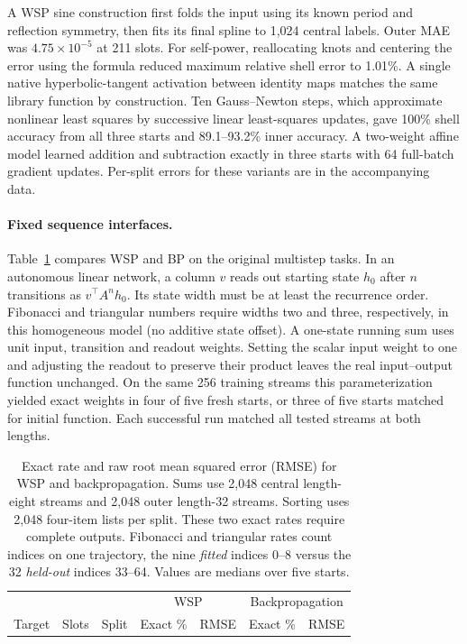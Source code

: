 A WSP sine construction first folds the input using its known period and reflection symmetry, then fits its final spline to 1,024 central labels. Outer MAE was $4.75\times10^{-5}$ at 211 slots. For self-power, reallocating knots and centering the error using the formula reduced maximum relative shell error to 1.01\%. A single native hyperbolic-tangent activation between identity maps matches the same library function by construction. Ten Gauss--Newton steps, which approximate nonlinear least squares by successive linear least-squares updates, gave 100\% shell accuracy from all three starts and 89.1--93.2\% inner accuracy. A two-weight affine model learned addition and subtraction exactly in three starts with 64 full-batch gradient updates. Per-split errors for these variants are in the accompanying data.

\paragraph{Fixed sequence interfaces.}
Table~\ref{tab:seq} compares WSP and BP on the original multistep tasks. In an autonomous linear network, a column $v$ reads out starting state $h_0$ after $n$ transitions as $v^\top A^n h_0$. Its state width must be at least the recurrence order. Fibonacci and triangular numbers require widths two and three, respectively, in this homogeneous model (no additive state offset). A one-state running sum uses unit input, transition and readout weights. Setting the scalar input weight to one and adjusting the readout to preserve their product leaves the real input--output function unchanged. On the same 256 training streams this parameterization yielded exact weights in four of five fresh starts, or three of five starts matched for initial function. Each successful run matched all tested streams at both lengths.

\begin{table}[htbp]\centering\small
\caption{Exact rate and raw root mean squared error (RMSE) for WSP and backpropagation. Sums use 2,048 central length-eight streams and 2,048 outer length-32 streams. Sorting uses 2,048 four-item lists per split. These two exact rates require complete outputs. Fibonacci and triangular rates count indices on one trajectory, the nine \emph{fitted} indices 0--8 versus the 32 \emph{held-out} indices 33--64. Values are medians over five starts.}\label{tab:seq}
\begin{tabular}{@{}lrl r r r r@{}}\toprule
&&&\multicolumn{2}{c}{WSP}&\multicolumn{2}{c}{Backpropagation}\\
Target & Slots & Split & Exact \% & RMSE & Exact \% & RMSE\\\midrule
\end{tabular}\end{table}

